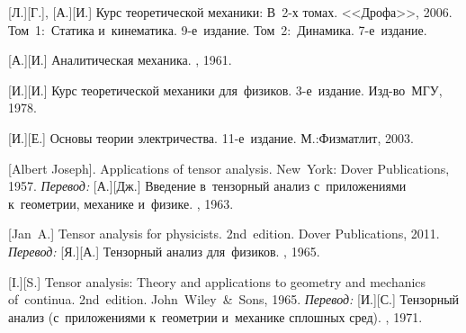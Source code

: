 \begin{thebibliography}{123}
\begin{otherlanguage}{russian}
[Л.][Г.], [А.][И.] Курс теоретической механики: В~2\hbox{-}х томах. <<Дрофа>>, 2006.
Том~1:~Статика и~кинематика. 9\hbox{-}е~издание. 
Том~2:~Динамика. 7\hbox{-}е~издание. 

[А.][И.] Аналитическая механика. \fizmatgiz, 1961. 

[И.][И.] Курс теоретической механики для~физиков. 3\hbox{-}е~издание. Изд\hbox{-}во~МГУ, 1978. 

[И.][Е.] %
Основы теории электричества. 11\hbox{-}е~издание. М.:\;Физматлит, 2003.

%
%



[Albert Joseph]. Applications of tensor analysis. New~York: Dover Publications, 1957. 
\emph{Перевод:} [А.][Дж.] Введение в~тензорный анализ с~приложениями к~геометрии, механике и~физике. \fizmatgiz, 1963. 

[Jan~A.] Tensor analysis for physicists. 2nd~edition. Dover Publications, 2011. 
\emph{Перевод:} [Я.][А.] Тензорный анализ для~физиков. \naukapublisher, 1965. 

[I.][S.] Tensor analysis: Theory and applications to geometry and mechanics of~continua. 2nd~edition. John~Wiley~\&~Sons, 1965. 
\emph{Перевод:} [И.][С.] Тензорный анализ (с~приложениями к~геометрии и~механике сплошных сред). \naukapublisher, 1971. 


\end{otherlanguage}
\end{thebibliography}
